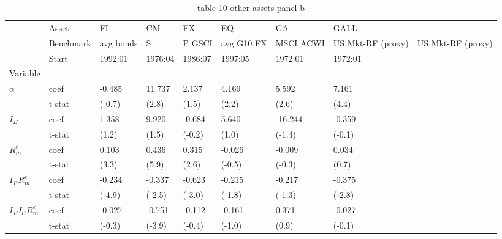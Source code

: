 \begin{table}[htbp]
  \centering
  \caption{table 10 other assets panel b}
  \label{tab:table_10_other_assets_panel_b}
  \begin{tabular}{llllllll}
\toprule
 & Asset & FI & CM & FX & EQ & GA & GALL \\
 & Benchmark & avg bonds & S&P GSCI & avg G10 FX & MSCI ACWI & US Mkt-RF (proxy) & US Mkt-RF (proxy) \\
 & Start & 1992:01 & 1976:04 & 1986:07 & 1997:05 & 1972:01 & 1972:01 \\
Variable &  &  &  &  &  &  &  \\
\midrule
{} & coef & -0.485 & 11.737 & 2.137 & 4.169 & 5.592 & 7.161 \\
 & t-stat & (-0.7) & (2.8) & (1.5) & (2.2) & (2.6) & (4.4) \\
 & coef & 1.358 & 9.920 & -0.684 & 5.640 & -16.244 & -0.359 \\
 & t-stat & (1.2) & (1.5) & (-0.2) & (1.0) & (-1.4) & (-0.1) \\
 & coef & 0.103 & 0.436 & 0.315 & -0.026 & -0.009 & 0.034 \\
 & t-stat & (3.3) & (5.9) & (2.6) & (-0.5) & (-0.3) & (0.7) \\
 & coef & -0.234 & -0.337 & -0.623 & -0.215 & -0.217 & -0.375 \\
 & t-stat & (-4.9) & (-2.5) & (-3.0) & (-1.8) & (-1.3) & (-2.8) \\
 & coef & -0.027 & -0.751 & -0.112 & -0.161 & 0.371 & -0.027 \\
 & t-stat & (-0.3) & (-3.9) & (-0.4) & (-1.0) & (0.9) & (-0.1) \\
\bottomrule
\end{tabular}

\end{table}
